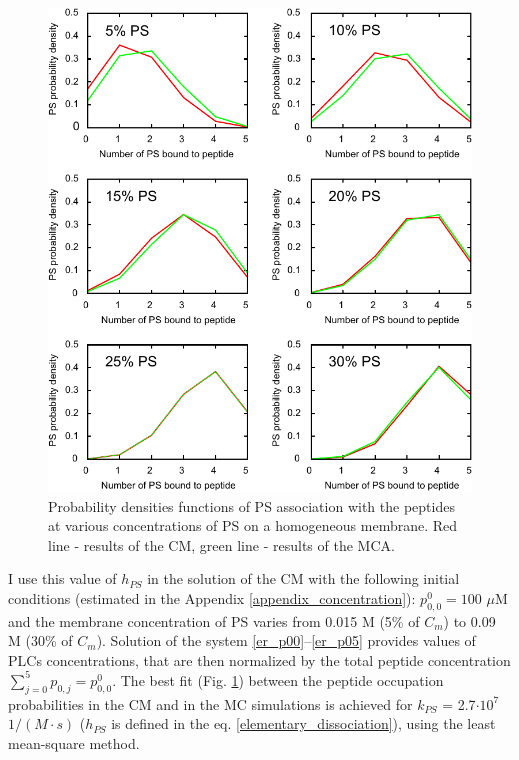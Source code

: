 \begin{figure}[!ht]
\begin{center}
 \includegraphics[scale=1.1]{../figures/occupation_probabilites_maraphet1.pdf}
\end{center}
\caption[Comparison of CM and MCA for the probability density functions of peptide-PS association]{Probability densities functions of PS association with the peptides at various concentrations of PS on a homogeneous membrane. Red line - results of the CM, green line - results of the MCA.}
\label{fig:occupation_probabilites1}
\end{figure}

I use this value of $h_{PS}$ in the solution of the CM with the following initial conditions (estimated in the Appendix \ref{appendix_concentration}): $p_{0,0}^0 = 100$ $\mu$M and the membrane concentration of PS varies from 0.015 M (5\% of $C_m$) to 0.09 M (30\% of $C_m$).  Solution of the system \eqref{er_p00}--\eqref{er_p05} provides values of PLCs concentrations, that are then normalized by the total peptide concentration $\sum_{j=0}^5p_{0,j}=p_{0,0}^0$. The best fit (Fig. \ref{fig:occupation_probabilites1}) between the peptide occupation probabilities in the CM and in the MC simulations is achieved for $k_{PS}$ = 2.7$\cdot 10^7$ $1/(M\cdot s)$ ($h_{PS}$ is defined in the eq. \eqref{elementary_dissociation}), using the least mean-square method. 

